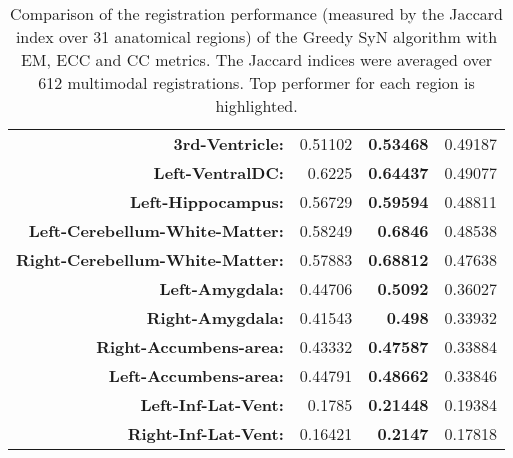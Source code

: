\begin{table}[htbp]
{\begin{tabular}{rrrr}
    \textbf{3rd-Ventricle:} & 0.51102 & \textbf{0.53468} & 0.49187 \\
    \textbf{Left-VentralDC:} & 0.6225 & \textbf{0.64437} & 0.49077 \\
    \textbf{Left-Hippocampus:} & 0.56729 & \textbf{0.59594} & 0.48811 \\
    \textbf{Left-Cerebellum-White-Matter:} & 0.58249 & \textbf{0.6846} & 0.48538 \\
    \textbf{Right-Cerebellum-White-Matter:} & 0.57883 & \textbf{0.68812} & 0.47638 \\
    \textbf{Left-Amygdala:} & 0.44706 & \textbf{0.5092} & 0.36027 \\
    \textbf{Right-Amygdala:} & 0.41543 & \textbf{0.498} & 0.33932 \\
    \textbf{Right-Accumbens-area:} & 0.43332 & \textbf{0.47587} & 0.33884 \\
    \textbf{Left-Accumbens-area:} & 0.44791 & \textbf{0.48662} & 0.33846 \\
    \textbf{Left-Inf-Lat-Vent:} & 0.1785 & \textbf{0.21448} & 0.19384 \\
    \textbf{Right-Inf-Lat-Vent:} & 0.16421 & \textbf{0.2147} & 0.17818 \\
    \bottomrule
    \end{tabular}}%
    \caption{Comparison of the registration performance (measured by the Jaccard index over 31 anatomical regions) of the Greedy SyN algorithm with EM, ECC and CC metrics. The Jaccard
indices were averaged over 612 multimodal registrations. Top performer for each region is highlighted.}
  \label{tab:multimodal_results_seg}%
\end{table}%
